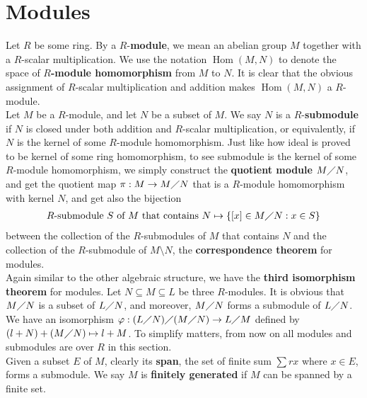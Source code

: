 \documentclass{report}
\begin{document}
\section{Modules}
Let $R$ be some ring. By a $R$-\textbf{module}, we mean an abelian group $M$ together with a $R$-scalar multiplication. We use the notation $\operatorname{Hom}(M,N)$ to denote the space of \textbf{$R$-module homomorphism} from  $M$ to $N$. It is clear that the obvious assignment of $R$-scalar multiplication and addition makes $\operatorname{Hom}(M,N)$ a $R$-module.\\

Let $M$ be a  $R$-module, and let $N$ be a subset of  $M$. We say $N$ is a $R$-\textbf{submodule} if $N$ is closed under both addition and $R$-scalar multiplication, or equivalently, if $N$ is the kernel of some  $R$-module homomorphism. Just like how ideal is proved to be kernel of some ring homomorphism, to see submodule is the kernel of some $R$-module homomorphism, we simply construct the \textbf{quotient module} $M\diagup N$, and get the quotient map $\pi :M\rightarrow M\diagup N$ that is a $R$-module homomorphism with kernel $N$, and get also the bijection
\begin{align*}
R\text{-submodule $S$ of  $M$ that contains  $N$}\mapsto \{ [x]\in M \diagup N: x \in S \}
\end{align*}
 between the collection of the $R$-submodules of $M$ that contains  $N$ and the collection of the $R$-submodule of  $M\setminus N$, the  \textbf{correspondence theorem} for modules.\\


Again similar to the other algebraic structure, we have the \textbf{third isomorphism theorem} for modules. Let $N \subseteq M \subseteq L$ be three $R$-modules. It is obvious that $M\diagup N$ is a subset of $L\diagup N$, and moreover, $M\diagup  N$ forms a submodule of  $L\diagup N$. We have an isomorphism $\pfi:(L\quotient N)\quotient (M\quotient N)\to L\quotient M$ defined by $(l+N)+ (M\diagup N)\mapsto l+M$. To simplify matters, from now on all modules and submodules are over $R$ in this section. \\

Given a subset $E$ of  $M$, clearly its \textbf{span}, the set of finite sum $\sum rx$ where $x \in E$, forms a submodule. We say  $M$ is \textbf{finitely generated} if $M$ can be spanned by a finite set.\\
\end{document}
